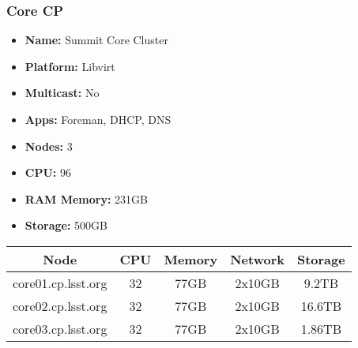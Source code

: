 \newpage
\subsubsection{Core CP}
\begin{itemize}
  \itemsep0em 
  \item \textbf{Name:}       Summit Core Cluster
  \item \textbf{Platform:}   Libvirt
  \item \textbf{Multicast:}  No
  \item \textbf{Apps:}       Foreman, DHCP, DNS
  \item \textbf{Nodes:}      3
  \item \textbf{CPU:}        96
  \item \textbf{RAM Memory:} 231GB
  \item \textbf{Storage:}   500GB
\end{itemize}
\begin{center}
  \small
  \begin{tabular}{||c c c c c||}
    \hline
    \textbf{Node} & \textbf{CPU} & \textbf{Memory} & \textbf{Network} & \textbf{Storage} \\ [0.5ex]
    \hline
    core01.cp.lsst.org & 32 & 77GB & 2x10GB & 9.2TB \\
    \hline
    core02.cp.lsst.org & 32 & 77GB & 2x10GB & 16.6TB \\
    \hline
    core03.cp.lsst.org & 32 & 77GB & 2x10GB & 1.86TB \\
    \hline
  \end{tabular}
\end{center}

